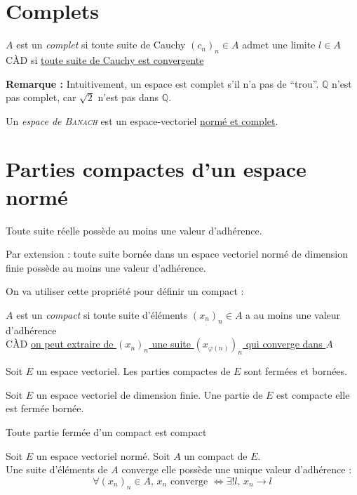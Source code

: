 \documentclass[11pt,a4paper,fleqn,pdftex]{report}
\begin{document}
\section{Complets} %
\label{sec:complets}
\begin{dfn}[Complet]
$A$ est un \emph{complet} si toute suite de Cauchy $(c_n)_n \in A$ admet une limite $l\in A$\\
CÀD si \uline{toute suite de Cauchy est convergente}
\end{dfn}
\textbf{Remarque :} Intuitivement, un espace est complet s'il n'a pas de \enquote{trou}. $\mathbb{Q}$ n'est pas complet, car $\sqrt{2}$ n'est pas dans $\mathbb{Q}$.

\begin{dfn}
Un \emph{espace de \textsc{Banach}} est un espace-vectoriel \uline{normé et complet}.
\end{dfn}
\section{Parties compactes d'un espace normé} %
\label{sec:compacts}
\begin{itheorem}
     Toute suite réelle  possède au moins une valeur d'adhérence.\par
     Par extension : toute suite bornée dans un espace vectoriel normé de dimension finie possède au moins une valeur d'adhérence.
\end{itheorem}
On va utiliser cette propriété pour définir un compact :
\begin{dfn}[Compact]
$A$ est un \emph{compact} si toute suite d'éléments $(x_n)_n \in A$ a au moins une valeur d'adhérence\\
CÀD \uline{on peut extraire de $(x_n)_n$ une suite $\left( x_{\varphi(n)} \right)
_n$ qui converge dans $A$}
\end{dfn}
\begin{itheorem}
     Soit $E$ un espace vectoriel. Les parties compactes de $E$ sont fermées et bornées.
\end{itheorem}
\begin{theorem}
     Soit $E$ un espace vectoriel de dimension finie. \newline
     Une partie de $E$ est compacte \ssi elle est fermée bornée.
\end{theorem}
\begin{theorem}
     Toute partie fermée d'un compact est compact
\end{theorem}
\begin{theorem}
     Soit $E$ un espace vectoriel normé. Soit $A$ un compact de $E$.\\
     Une suite d'éléments de $A$ converge \ssi elle possède une unique valeur d'adhérence : 
     \begin{equation}
     \forall (x_n)_n \in A,\, x_n \text{ converge } \Leftrightarrow \exists ! l,\, x_n\to l
     \end{equation}
\end{theorem}
\end{document}
